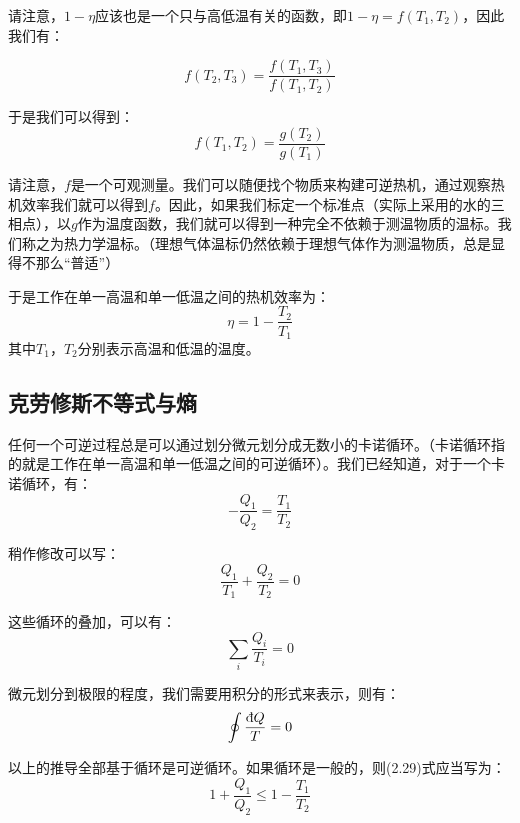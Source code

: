 \documentclass[a4paper, 10pt, openany]{book}%
\begin{document}
请注意，$1-\eta$应该也是一个只与高低温有关的函数，即$1-\eta=f(T_1,T_2)$，因此我们有：

\begin{equation}
  f(T_2,T_3)=\frac{f(T_1,T_3)}{f(T_1,T_2)}
\end{equation}

于是我们可以得到：
\begin{equation}
  f(T_1,T_2)=\frac{g(T_2)}{g(T_1)}
\end{equation}

请注意，$f$是一个可观测量。我们可以随便找个物质来构建可逆热机，通过观察热机效率我们就可以得到$f$。因此，如果我们标定一个标准点（实际上采用的水的三相点），以$g$作为温度函数，我们就可以得到一种完全不依赖于测温物质的温标。我们称之为热力学温标。（理想气体温标仍然依赖于理想气体作为测温物质，总是显得不那么“普适”）



于是工作在单一高温和单一低温之间的热机效率为：
\begin{equation}
  \eta=1-\frac{T_2}{T_1}
\end{equation}
其中$T_1$，$T_2$分别表示高温和低温的温度。



\subsection{克劳修斯不等式与熵}

任何一个可逆过程总是可以通过划分微元划分成无数小的卡诺循环。（卡诺循环指的就是工作在单一高温和单一低温之间的可逆循环）。我们已经知道，对于一个卡诺循环，有：
\begin{equation}
  -\frac{Q_1}{Q_2}=\frac{T_1}{T_2}
\end{equation}

 稍作修改可以写：
\begin{equation}
  \frac{Q_1}{T_1}+\frac{Q_2}{T_2}=0
\end{equation}

这些循环的叠加，可以有：
\begin{equation}
  \sum_{i}\frac{Q_i}{T_i}=0
\end{equation}

微元划分到极限的程度，我们需要用积分的形式来表示，则有：
\begin{equation}
  \oint\frac{\text{\dj}Q}{T}=0
\end{equation}

以上的推导全部基于循环是可逆循环。如果循环是一般的，则(2.29)式应当写为：
\begin{equation}
  1+\frac{Q_1}{Q_2}\leq1-\frac{T_1}{T_2}\end{equation}
\end{document}

